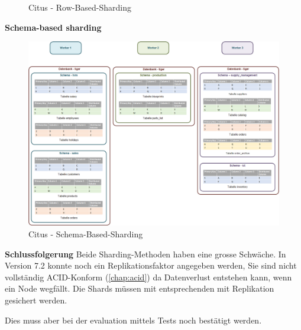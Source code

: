 \begin{flushleft}
\begin{flushleft}
\begin{flushleft}
\begin{figure}[H]
                \caption{Citus - Row-Based-Sharding}
                \label{fig:citus_row-based-sharding}
            \end{figure}
        \end{flushleft}
        \begin{flushleft}
            \textbf{Schema-based sharding}
            \begin{figure}[H]
                \centering
                \includegraphics[width=0.8\linewidth]{source/implementation/evaluation/postgresql_ha_solutions/stackgres/citus_schema-based-sharding}
                \caption{Citus - Schema-Based-Sharding}
                \label{fig:citus_schema-based-sharding}
            \end{figure}
        \end{flushleft}
        \begin{flushleft}
            \textbf{Schlussfolgerung}
            Beide Sharding-Methoden haben eine grosse Schwäche.
            In Version 7.2 konnte noch ein Replikationsfaktor angegeben werden\cite{Citus},
            Sie sind nicht vollständig ACID-Konform (\autoref{chap:acid}) da Datenverlust entstehen kann, wenn ein Node wegfällt.
            Die Shards müssen mit entsprechenden mit Replikation gesichert werden\cite{4GDXA49I}.

            Dies muss aber bei der evaluation mittels Tests noch bestätigt werden.
        \end{flushleft}
    \end{flushleft}
\end{flushleft}
